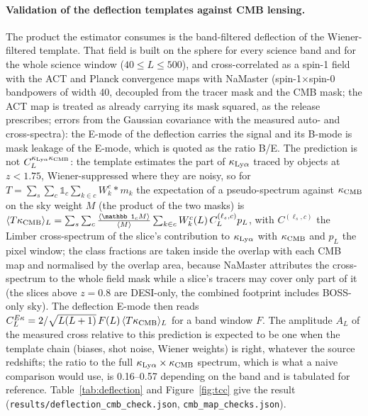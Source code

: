 \documentclass[11pt,a4paper]{article}
\newcommand{\kl}{\kappa_{{\rm Ly}\alpha}}
\newcommand{\kc}{\kappa_{\rm CMB}}
\begin{document}
\paragraph{Validation of the deflection templates against CMB lensing.} The product the estimator consumes is the band-filtered deflection of the Wiener-filtered template. That field is built on the sphere for every science band and for the whole science window ($40\le L\le500$), and cross-correlated as a spin-1 field with the ACT and Planck convergence maps with NaMaster (spin-1$\times$spin-0 bandpowers of width 40, decoupled from the tracer mask and the CMB mask; the ACT map is treated as already carrying its mask squared, as the release prescribes; errors from the Gaussian covariance with the measured auto- and cross-spectra): the E-mode of the deflection carries the signal and its B-mode is mask leakage of the E-mode, which is quoted as the ratio B/E. The prediction is not $C_L^{\kl\kc}$: the template estimates the part of $\kl$ traced by objects at $z<1.75$, Wiener-suppressed where they are noisy, so for $T=\sum_s\sum_c\mathbb 1_c\sum_{k\in c}W^c_k\ast m_k$ the expectation of a pseudo-spectrum against $\kc$ on the sky weight $M$ (the product of the two masks) is $\langle T\kc\rangle_L=\sum_s\sum_c\frac{\langle\mathbb 1_cM\rangle}{\langle M\rangle}\sum_{k\in c}W^c_k(L)\,C_L^{(\ell_s,c)}p_L$, with $C^{(\ell_s,c)}$ the Limber cross-spectrum of the slice's contribution to $\kl$ with $\kc$ and $p_L$ the pixel window; the class fractions are taken inside the overlap with each CMB map and normalised by the overlap area, because NaMaster attributes the cross-spectrum to the whole field mask while a slice's tracers may cover only part of it (the slices above $z=0.8$ are DESI-only, the combined footprint includes BOSS-only sky). The deflection E-mode then reads $C_L^{E\kappa}=2/\sqrt{L(L+1)}\,F(L)\,\langle T\kc\rangle_L$ for a band window $F$. The amplitude $A_L$ of the measured cross relative to this prediction is expected to be one when the template chain (biases, shot noise, Wiener weights) is right, whatever the source redshifts; the ratio to the full $\kl\times\kc$ spectrum, which is what a naive comparison would use, is 0.16--0.57 depending on the band and is tabulated for reference. Table~\ref{tab:deflection} and Figure~\ref{fig:tcc} give the result (\texttt{results/deflection\_cmb\_check.json}, \texttt{cmb\_map\_checks.json}).
\end{document}
